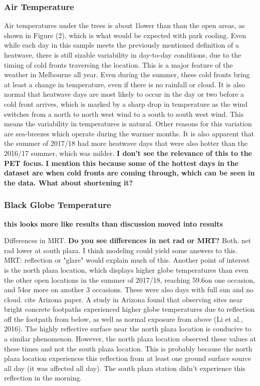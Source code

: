\documentclass[twocolumn, a4paper]{article}
\providecommand{\comment}[1]{{\large\bf #1}}
\begin{document}
\subsubsection{Air Temperature}
Air temperatures under the trees is about 1\celsius lower than than the open areas, as shown in Figure (2), which is what would be expected with park cooling. Even while each day in this sample meets the previously mentioned definition of a heatwave, there is still sizable variability in day-to-day conditions, due to the timing of cold fronts traversing the location. This is a major feature of the weather in Melbourne all year. Even during the summer, these cold fronts bring at least a change in temperature, even if there is no rainfall or cloud. It is also normal that heatwave days are most likely to occur in the day or two before a cold front arrives, which is marked by a sharp drop in temperature as the wind switches from a north to north west wind to a south to south west wind. This means the variability in temperatures is natural. Other reasons for this variation are sea-breezes which operate during the warmer months. It is also apparent that the summer of 2017/18 had more heatwave days that were also hotter than the 2016/17 summer, which was milder. \comment{I don't see the relevance of this to the PET focus.}
\comment{I mention this because some of the hottest days in the dataset are when cold fronts are coming through, which can be seen in the data. What about shortening it?}
\subsubsection{Black Globe Temperature}



\comment{this looks  more like results than discussion}
\comment{moved into results}

Differences in MRT.
\comment{Do you see differences in net rad or MRT?} Both. net rad lower at south plaza. I think modeling could yield some answers to this. MRT: reflection or "glare" would explain much of this.
Another point of interest is the north plaza location, which displays higher globe temperatures than even the other open locations in the summer of 2017/18, reaching 59.6\celsius on one occasion, and 54\celsius or more on another 3 occasions. These were also days with full sun and no cloud. cite Arizona paper. A study in Arizona found that observing sites near bright concrete footpaths experienced higher globe temperatures due to reflection off the footpath from below, as well as normal exposure from above (Li et al., 2016). The highly reflective surface near the north plaza location is conducive to a similar phenomenon. However, the north plaza location observed these values at these times and not the south plaza location. This is probably because the north plaza location experiences this reflection from at least one ground surface source all day (it was affected all day). The south plaza station didn't experience this reflection in the morning.
\end{document}
